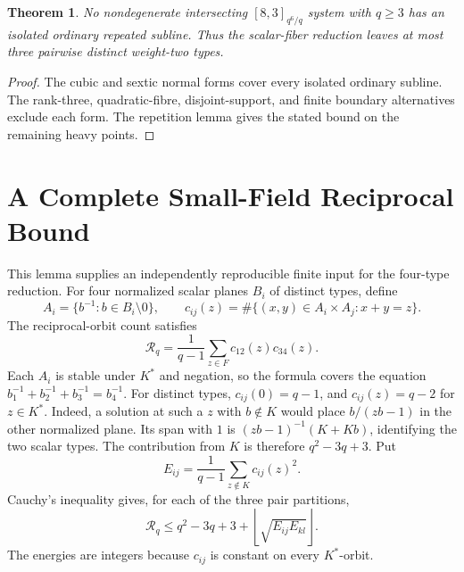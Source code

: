 \documentclass[12pt,letterpaper,onecolumn]{article}
\newtheorem{theorem}{Theorem}
\theoremstyle{definition}
\theoremstyle{remark}
\begin{document}
\begin{theorem}\label{thm:core-isolated-closed}
No nondegenerate intersecting \([8,3]_{q^6/q}\) system with \(q\ge3\)
has an isolated ordinary repeated subline.  Thus the scalar-fiber reduction
leaves at most three pairwise distinct weight-two types.
\end{theorem}
\begin{proof}
The cubic and sextic normal forms cover every isolated ordinary subline.
The rank-three, quadratic-fibre, disjoint-support, and finite boundary
alternatives exclude each form.  The repetition lemma gives the stated
bound on the remaining heavy points.
\end{proof}

\section{A Complete Small-Field Reciprocal Bound}
This lemma supplies an independently reproducible finite input for the four-type reduction.
For four normalized scalar planes \(B_i\) of distinct types, define
\[
A_i=\{b^{-1}:b\in B_i\setminus0\},\qquad
c_{ij}(z)=\#\{(x,y)\in A_i\times A_j:x+y=z\}.
\]
The reciprocal-orbit count satisfies
\[
\mathcal R_q=\frac1{q-1}\sum_{z\in F}c_{12}(z)c_{34}(z).
\]
Each \(A_i\) is stable under \(K^*\) and negation, so the formula covers the equation \(b_1^{-1}+b_2^{-1}+b_3^{-1}=b_4^{-1}\).
For distinct types, \(c_{ij}(0)=q-1\), and \(c_{ij}(z)=q-2\) for \(z\in K^*\).
Indeed, a solution at such a \(z\) with \(b\notin K\) would place
\(b/(zb-1)\) in the other normalized plane. Its span with \(1\) is
\((zb-1)^{-1}(K+Kb)\), identifying the two scalar types.
The contribution from \(K\) is therefore \(q^2-3q+3\).
Put
\[
E_{ij}=\frac1{q-1}\sum_{z\notin K}c_{ij}(z)^2.
\]
Cauchy's inequality gives, for each of the three pair partitions,
\[
\mathcal R_q\le q^2-3q+3+\left\lfloor\sqrt{E_{ij}E_{kl}}\right\rfloor.
\]
The energies are integers because \(c_{ij}\) is constant on every \(K^*\)-orbit.
\end{document}
